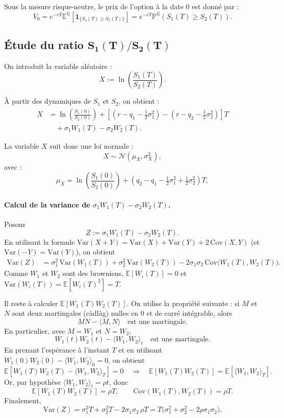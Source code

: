 Sous la mesure risque-neutre, le prix de l’option à la date $0$ est donné par :
\[
V_0 = e^{-rT} \mathbb{E}^{\mathbb{Q}}\!\left[ \mathbf{1}_{\{ S_1(T) \ge S_2(T) \}} \right]
= e^{-rT} \mathbb{P}^{\mathbb{Q}}\!\left( S_1(T) \ge S_2(T) \right).
\]

\subsection*{Étude du ratio $\boldsymbol{S_1(T)/S_2(T)}$}

On introduit la variable aléatoire :
\[
X := \ln\!\left( \frac{S_1(T)}{S_2(T)} \right).
\]

À partir des dynamiques de $S_1$ et $S_2$, on obtient :
\begin{align*}
X
&= \ln\!\left( \frac{S_1(0)}{S_2(0)} \right)
+ \left[(r - q_1 - \tfrac12 \sigma_1^2) - (r - q_2 - \tfrac12 \sigma_2^2)\right] T \\
&\quad + \sigma_1 W_1(T) - \sigma_2 W_2(T).
\end{align*}

La variable $X$ suit donc une loi normale :
\[
X \sim \mathcal{N}(\mu_X, \sigma_X^2),
\]
avec :
\[
\mu_X
= \ln\!\left( \frac{S_1(0)}{S_2(0)} \right)
+ \left(q_2 - q_1 - \tfrac12 \sigma_1^2 + \tfrac12 \sigma_2^2 \right) T,
\]

\paragraph{Calcul de la variance de $\sigma_1 W_1(T)-\sigma_2 W_2(T)$.}
Posons
\[
Z := \sigma_1 W_1(T)-\sigma_2 W_2(T).
\]
En utilisant la formule $\mathrm{Var}(X+Y)=\mathrm{Var}(X)+\mathrm{Var}(Y)+2\,\mathrm{Cov}(X,Y)$ (et $\mathrm{Var}(-Y)=\mathrm{Var}(Y)$), on obtient
\begin{align*}
\mathrm{Var}(Z)
&= \sigma_1^2\,\mathrm{Var}(W_1(T))+\sigma_2^2\,\mathrm{Var}(W_2(T))
-2\sigma_1\sigma_2\,\mathrm{Cov}\!\big(W_1(T),W_2(T)\big).
\end{align*}
Comme $W_1$ et $W_2$ sont des browniens, $\mathbb{E}[W_i(T)]=0$ et $\mathrm{Var}(W_i(T))=\mathbb{E}[W_i(T)^2]=T$.

Il reste à calculer $\mathbb{E}[W_1(T)W_2(T)]$.
On utilise la propriété suivante : si $M$ et $N$ sont deux martingales (càdlàg) nulles en $0$ et de carré intégrable, alors
\[
MN-\langle M,N\rangle
\quad \text{est une martingale.}
\]
En particulier, avec $M=W_1$ et $N=W_2$,
\[
W_1(t)W_2(t)-\langle W_1,W_2\rangle_t
\quad \text{est une martingale.}
\]
En prenant l'espérance à l'instant $T$ et en utilisant $W_1(0)W_2(0)-\langle W_1,W_2\rangle_0=0$, on obtient
\[
\mathbb{E}\!\left[W_1(T)W_2(T)-\langle W_1,W_2\rangle_T\right]=0
\quad\Longrightarrow\quad
\mathbb{E}[W_1(T)W_2(T)]=\mathbb{E}\!\left[\langle W_1,W_2\rangle_T\right].
\]
Or, par hypothèse $\langle W_1,W_2\rangle_t=\rho t$, donc
\[
\mathbb{E}[W_1(T)W_2(T)]=\rho T,
\qquad
\mathrm{Cov}(W_1(T),W_2(T))=\rho T.
\]
Finalement,
\[
\mathrm{Var}(Z)
=\sigma_1^2 T+\sigma_2^2 T-2\sigma_1\sigma_2\,\rho T
= T\big(\sigma_1^2+\sigma_2^2-2\rho\sigma_1\sigma_2\big).
\]

